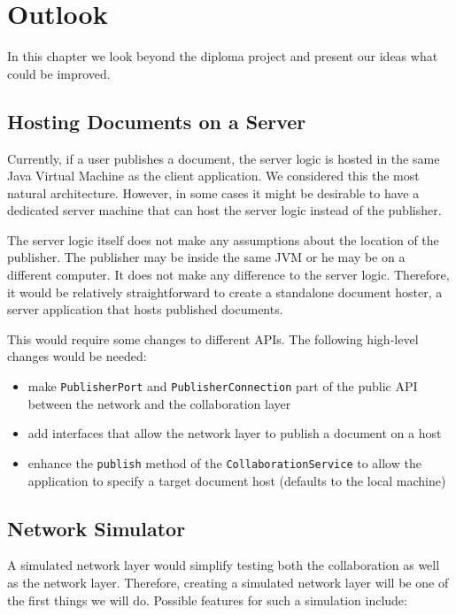 \chapter{Outlook}
\label{chapter:outlook}

In this chapter we look beyond the diploma project and present our ideas
what could be improved.



\section{Hosting Documents on a Server}
Currently, if a user publishes a document, the server logic is hosted
in the same Java Virtual Machine as the client application. We considered
this the most natural architecture. However, in some cases it might be
desirable to have a dedicated server machine that can host the server
logic instead of the publisher.

The server logic itself does not make any assumptions about the location
of the publisher. The publisher may be inside the same JVM or he may be
on a different computer. It does not make any difference to the server logic.
Therefore, it would be relatively straightforward to create a standalone
document hoster, a server application that hosts published documents.

This would require some changes to different APIs. The following high-level
changes would be needed:

\begin{itemize}
 \item make \texttt{PublisherPort} and \texttt{PublisherConnection} part of
       the public API between the network and the collaboration layer
 \item add interfaces that allow the network layer to publish a document
       on a host
 \item enhance the \texttt{publish} method of the \texttt{CollaborationService}
       to allow the application to specify a target document host (defaults to
       the local machine)
\end{itemize}



\section{Network Simulator}
A simulated network layer would simplify testing both the collaboration as 
well as the network layer. Therefore, creating a simulated network layer
will be one of the first things we will do. Possible features for such
a simulation include:

